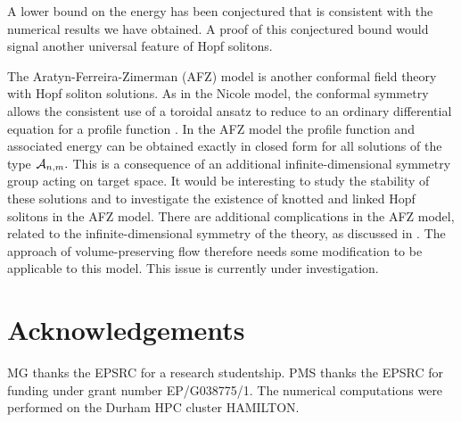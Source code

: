 \documentclass[12pt]{article}
\begin{document}
A lower bound on the energy has been conjectured that is consistent
with the numerical results we have obtained. A proof of this 
conjectured bound would signal another universal feature of Hopf 
solitons. 

 
The Aratyn-Ferreira-Zimerman (AFZ) model \cite{AFZ1} is another
conformal field theory with Hopf soliton solutions. 
As in the Nicole model, the conformal symmetry allows the consistent 
use of a toroidal ansatz to reduce to an ordinary differential 
equation for a profile function \cite{BF}.
In the AFZ model the profile function and associated energy 
can be obtained exactly in closed form \cite{AFZ2} 
for all solutions of the type ${\cal A}_{n,m}.$ 
This is a consequence of an additional infinite-dimensional 
symmetry group acting on target space. It would be interesting to
study the stability of these solutions and to investigate the 
existence of knotted and linked Hopf solitons in the AFZ model.
There are additional complications in the AFZ model, related to
the infinite-dimensional symmetry of the theory, as discussed
in \cite{ASW}. The approach of volume-preserving flow
therefore needs some modification to be applicable to this
model. This issue is currently under investigation. 


 
\section*{Acknowledgements}
MG thanks the EPSRC for a research studentship.
PMS thanks the EPSRC for funding under grant number EP/G038775/1.
The numerical computations were performed on the Durham HPC cluster HAMILTON.
\end{document}
